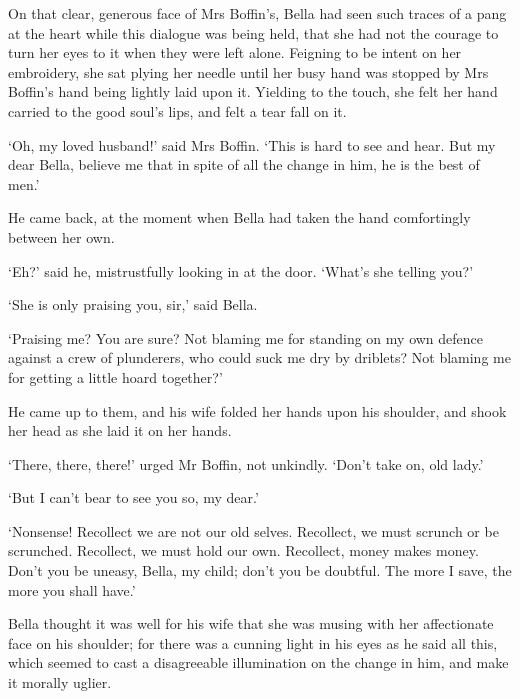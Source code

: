 On that clear, generous face of Mrs Boffin’s, Bella had seen such traces
of a pang at the heart while this dialogue was being held, that she
had not the courage to turn her eyes to it when they were left alone.
Feigning to be intent on her embroidery, she sat plying her needle until
her busy hand was stopped by Mrs Boffin’s hand being lightly laid upon
it. Yielding to the touch, she felt her hand carried to the good soul’s
lips, and felt a tear fall on it.

‘Oh, my loved husband!’ said Mrs Boffin. ‘This is hard to see and hear.
But my dear Bella, believe me that in spite of all the change in him, he
is the best of men.’

He came back, at the moment when Bella had taken the hand comfortingly
between her own.

‘Eh?’ said he, mistrustfully looking in at the door. ‘What’s she telling
you?’

‘She is only praising you, sir,’ said Bella.

‘Praising me? You are sure? Not blaming me for standing on my own
defence against a crew of plunderers, who could suck me dry by driblets?
Not blaming me for getting a little hoard together?’

He came up to them, and his wife folded her hands upon his shoulder, and
shook her head as she laid it on her hands.

‘There, there, there!’ urged Mr Boffin, not unkindly. ‘Don’t take on,
old lady.’

‘But I can’t bear to see you so, my dear.’

‘Nonsense! Recollect we are not our old selves. Recollect, we must
scrunch or be scrunched. Recollect, we must hold our own. Recollect,
money makes money. Don’t you be uneasy, Bella, my child; don’t you be
doubtful. The more I save, the more you shall have.’

Bella thought it was well for his wife that she was musing with her
affectionate face on his shoulder; for there was a cunning light in
his eyes as he said all this, which seemed to cast a disagreeable
illumination on the change in him, and make it morally uglier.



